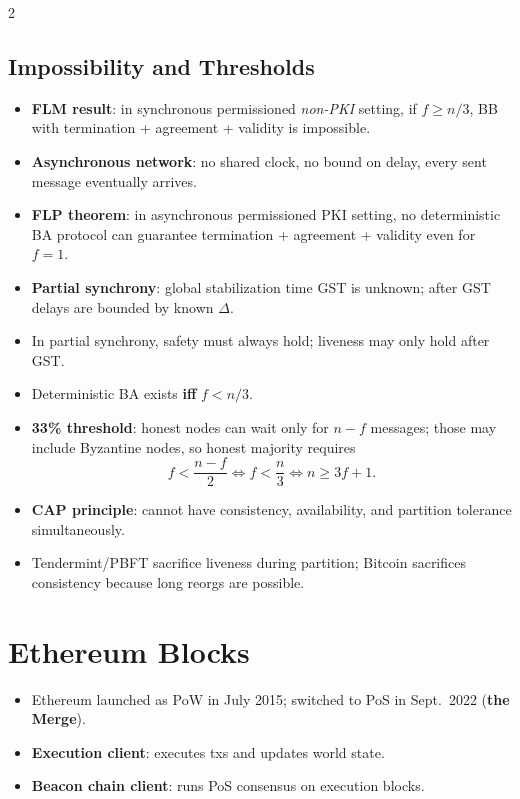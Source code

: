 \documentclass[10pt,a4paper]{article}
\newcommand{\term}[1]{\textbf{#1}}
\newcommand{\imp}[1]{\textbf{#1}}
\begin{document}
\begin{multicols*}{2}
\subsection*{Impossibility and Thresholds}
\begin{itemize}
\item \term{FLM result}: in synchronous permissioned \emph{non-PKI} setting, if $f \ge n/3$, BB with termination + agreement + validity is impossible.
\item \term{Asynchronous network}: no shared clock, no bound on delay, every sent message eventually arrives.
\item \term{FLP theorem}: in asynchronous permissioned PKI setting, no deterministic BA protocol can guarantee termination + agreement + validity even for $f=1$.
\item \term{Partial synchrony}: global stabilization time GST is unknown; after GST delays are bounded by known $\Delta$.
\item In partial synchrony, safety must always hold; liveness may only hold after GST.
\item Deterministic BA exists \imp{iff} $f < n/3$.
\item \term{33\% threshold}: honest nodes can wait only for $n-f$ messages; those may include Byzantine nodes, so honest majority requires
\[
f < \frac{n-f}{2} \iff f < \frac{n}{3} \iff n \ge 3f+1.
\]
\item \term{CAP principle}: cannot have consistency, availability, and partition tolerance simultaneously.
\item Tendermint/PBFT sacrifice liveness during partition; Bitcoin sacrifices consistency because long reorgs are possible.
\end{itemize}

\section*{Ethereum Blocks}
\begin{itemize}
\item Ethereum launched as PoW in July 2015; switched to PoS in Sept.\ 2022 (\term{the Merge}).
\item \term{Execution client}: executes txs and updates world state.
\item \term{Beacon chain client}: runs PoS consensus on execution blocks.
\end{itemize}


\end{multicols*}
\end{document}
